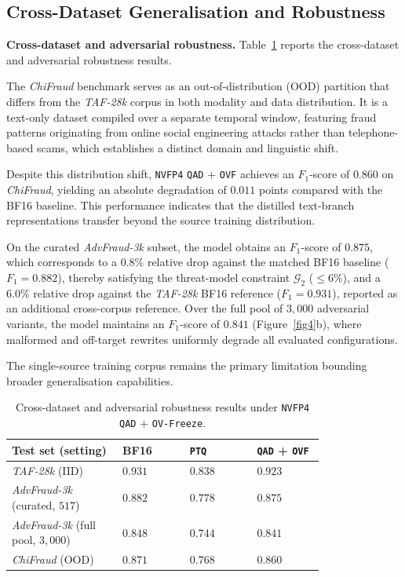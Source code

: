 \documentclass[a4paper,fleqn]{cas-sc}
\begin{document}
\subsection{Cross-Dataset Generalisation and Robustness}\label{sec:crossdata}

\medskip
\noindent\textbf{Cross-dataset and adversarial robustness.}
Table~\ref{tab4-cross-en} reports the cross-dataset and adversarial robustness results.

The \textit{ChiFraud} benchmark serves as an out-of-distribution (OOD) partition that differs from the \textit{TAF-28k} corpus in both modality and data distribution. It is a text-only dataset compiled over a separate temporal window, featuring fraud patterns originating from online social engineering attacks rather than telephone-based scams, which establishes a distinct domain and linguistic shift.

Despite this distribution shift, \texttt{NVFP4} \texttt{QAD} + \texttt{OVF} achieves an $F_1$-score of $0.860$ on \textit{ChiFraud}, yielding an absolute degradation of $0.011$ points compared with the BF16 baseline. This performance indicates that the distilled text-branch representations transfer beyond the source training distribution.

On the curated \textit{AdvFraud-3k} subset, the model obtains an $F_1$-score of $0.875$, which corresponds to a $0.8\%$ relative drop against the matched BF16 baseline ($F_1 = 0.882$), thereby satisfying the threat-model constraint $\mathcal{G}_2$ ($\le 6\%$), and a $6.0\%$ relative drop against the \textit{TAF-28k} BF16 reference ($F_1 = 0.931$), reported as an additional cross-corpus reference. Over the full pool of $3{,}000$ adversarial variants, the model maintains an $F_1$-score of $0.841$ (Figure~\ref{fig4}b), where malformed and off-target rewrites uniformly degrade all evaluated configurations.

The single-source training corpus remains the primary limitation bounding broader generalisation capabilities.

\begin{table}[!t]
\centering
\caption{Cross-dataset and adversarial robustness results under \texttt{NVFP4} \texttt{QAD} + \texttt{OV-Freeze}.}
\label{tab4-cross-en}
\small
\renewcommand{\arraystretch}{1.1}
\begin{tabular}{>{\centering\arraybackslash}p{0.28\linewidth}>{\centering\arraybackslash}p{0.17\linewidth}>{\centering\arraybackslash}p{0.17\linewidth}>{\centering\arraybackslash}p{0.17\linewidth}}
\toprule
\textbf{Test set (setting)} & \textbf{BF16} & \textbf{\texttt{PTQ}} & \textbf{\texttt{QAD} + \texttt{OVF}} \\
\midrule
\textit{TAF-28k} (IID) & $0.931$ & $0.838$ & $\mathbf{0.923}$ \\
\textit{AdvFraud-3k} (curated, $517$) & $0.882$ & $0.778$ & $\mathbf{0.875}$ \\
\textit{AdvFraud-3k} (full pool, $3{,}000$) & $0.848$ & $0.744$ & $\mathbf{0.841}$ \\
\textit{ChiFraud} (OOD) & $0.871$ & $0.768$ & $\mathbf{0.860}$ \\
\bottomrule
\end{tabular}
\end{table}
\end{document}
